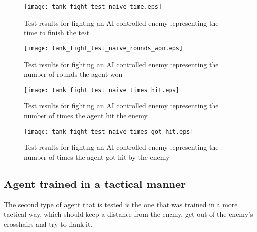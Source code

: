 \begin{figure}
    \begin{center}
        \texttt{[image: tank\_fight\_test\_naive\_time.eps]}
        \caption{Test results for fighting an AI controlled enemy representing the time to finish the test}
        \label{test_results_tank_fight_naive_time_bar_chart}
    \end{center}
\end{figure}

\begin{figure}
    \begin{center}
        \texttt{[image: tank\_fight\_test\_naive\_rounds\_won.eps]}
        \caption{Test results for fighting an AI controlled enemy representing the number of rounds the agent won}
        \label{test_results_tank_fight_naive_rounds_won_bar_chart}
    \end{center}
\end{figure}

\begin{figure}
    \begin{center}
        \texttt{[image: tank\_fight\_test\_naive\_times\_hit.eps]}
        \caption{Test results for fighting an AI controlled enemy representing the number of times the agent hit the enemy}
        \label{test_results_tank_fight_naive_times_hit_bar_chart}
    \end{center}
\end{figure}

\begin{figure}
    \begin{center}
        \texttt{[image: tank\_fight\_test\_naive\_times\_got\_hit.eps]}
        \caption{Test results for fighting an AI controlled enemy representing the number of times the agent got hit by the enemy}
        \label{test_results_tank_fight_naive_times_got_hit_bar_chart}
    \end{center}
\end{figure}



\subsection{Agent trained in a tactical manner}

The second type of agent that is tested is the one that was trained in a more tactical way, which should keep a distance from the enemy, get out of the enemy's crosshairs and try to flank it.

